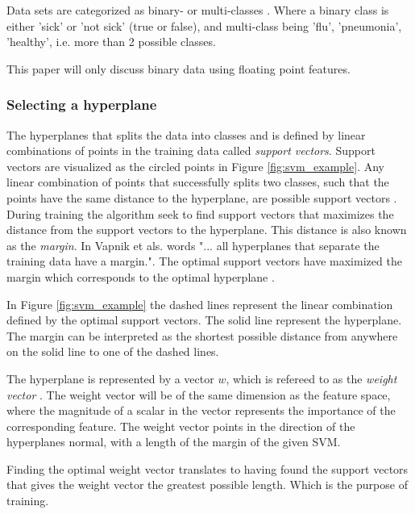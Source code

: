 \documentclass[a4paper,twoside]{bth}
\begin{document}
\par Data sets are categorized as binary- or multi-classes \cite{Japkowicz:2011}. Where a binary class is either 'sick' or 'not sick' (true or false), and multi-class being 'flu', 'pneumonia', 'healthy', i.e. more than 2 possible classes.

\par This paper will only discuss binary data using floating point features.

\subsubsection{Selecting a hyperplane}
\par The hyperplanes that splits the data into classes and is defined by linear combinations of points in the training data called \textit{support vectors}. Support vectors are visualized as the circled points in Figure \ref{fig:svm_example}. Any linear combination of points that successfully splits two classes, such that the points have the same distance to the hyperplane, are possible support vectors \cite{unpublished, Flach:2012:MLA:2490546}. During training the algorithm seek to find support vectors that maximizes the distance from the support vectors to the hyperplane. This distance is also known as the \textit{margin}. In Vapnik et als. words \cite{Cortes:1995:SN:218919.218929} "... all hyperplanes that separate the training data have a margin.". The optimal support vectors have maximized the margin which corresponds to the optimal hyperplane \cite{Flach:2012:MLA:2490546}. 

\par In Figure \ref{fig:svm_example} the dashed lines represent the linear combination defined by the optimal support vectors. The solid line represent the hyperplane. The margin can be interpreted as the shortest possible distance from anywhere on the solid line to one of the dashed lines. 

\par The hyperplane is represented by a vector $w$, which is refereed to as the \textit{weight vector} \cite{Flach:2012:MLA:2490546}. The weight vector will be of the same dimension as the feature space, where the magnitude of a scalar in the vector represents the importance of the corresponding feature. The weight vector points in the direction of the hyperplanes normal, with a length of the margin of the given SVM. 

\par Finding the optimal weight vector translates to having found the support vectors that gives the weight vector the greatest possible length. Which is the purpose of training. 
\end{document}
